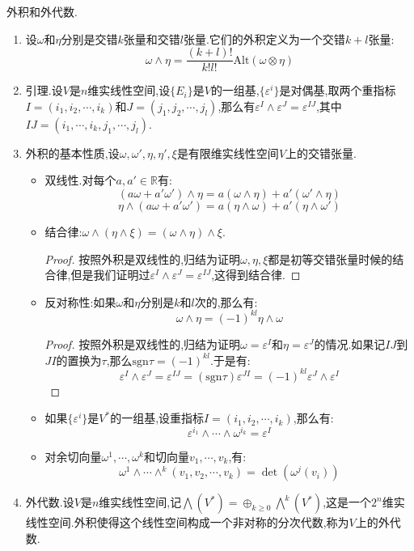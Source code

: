 外积和外代数.
\begin{enumerate}
	\item 设$\omega$和$\eta$分别是交错$k$张量和交错$l$张量.它们的外积定义为一个交错$k+l$张量:
	$$\omega\wedge\eta=\frac{(k+l)!}{k!l!}\mathrm{Alt}(\omega\otimes\eta)$$
	\item 引理.设$V$是$n$维实线性空间,设$\{E_i\}$是$V$的一组基,$\{\varepsilon^i\}$是对偶基,取两个重指标$I=(i_1,i_2,\cdots,i_k)$和$J=(j_1,j_2,\cdots,j_l)$,那么有$\varepsilon^I\wedge\varepsilon^J=\varepsilon^{IJ}$,其中$IJ=(i_1,\cdots,i_k,j_1,\cdots,j_l)$.
	\item 外积的基本性质,设$\omega,\omega',\eta,\eta',\xi$是有限维实线性空间$V$上的交错张量.
	\begin{itemize}
		\item 双线性.对每个$a,a'\in\mathbb{R}$有:
		$$(a\omega+a'\omega')\wedge\eta=a(\omega\wedge\eta)+a'(\omega'\wedge\eta)$$
		$$\eta\wedge(a\omega+a'\omega')=a(\eta\wedge\omega)+a'(\eta\wedge\omega')$$
		\item 结合律:$\omega\wedge(\eta\wedge\xi)=(\omega\wedge\eta)\wedge\xi$.
		\begin{proof}
			
			按照外积是双线性的,归结为证明$\omega,\eta,\xi$都是初等交错张量时候的结合律,但是我们证明过$\varepsilon^I\wedge\varepsilon^J=\varepsilon^{IJ}$,这得到结合律.
		\end{proof}
		\item 反对称性:如果$\omega$和$\eta$分别是$k$和$l$次的,那么有:
		$$\omega\wedge\eta=(-1)^{kl}\eta\wedge\omega$$
		\begin{proof}
			
			按照外积是双线性的,归结为证明$\omega=\varepsilon^I$和$\eta=\varepsilon^J$的情况.如果记$IJ$到$JI$的置换为$\tau$,那么$\mathrm{sgn}\tau=(-1)^{kl}$.于是有:
			$$\varepsilon^I\wedge\varepsilon^J=\varepsilon^{IJ}=(\mathrm{sgn}\tau)\varepsilon^{JI}=(-1)^{kl}\varepsilon^J\wedge\varepsilon^I$$
		\end{proof}
		\item 如果$\{\varepsilon^i\}$是$V^*$的一组基,设重指标$I=(i_1,i_2,\cdots,i_k)$,那么有:
		$$\varepsilon^{i_1}\wedge\cdots\wedge\omega^{i_k}=\varepsilon^I$$
		\item 对余切向量$\omega^1,\cdots,\omega^k$和切向量$v_1,\cdots,v_k$,有:
		$$\omega^1\wedge\cdots\wedge^k(v_1,v_2,\cdots,v_k)=\det\left(\omega^j(v_i)\right)$$
	\end{itemize}
    \item 外代数.设$V$是$n$维实线性空间,记$\bigwedge(V^*)=\oplus_{k\ge0}\bigwedge^k(V^*)$,这是一个$2^n$维实线性空间.外积使得这个线性空间构成一个非对称的分次代数,称为$V$上的外代数.
\end{enumerate}

